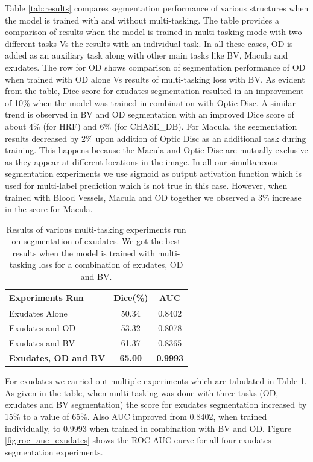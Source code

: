 \documentclass[utf8]{FrontiersinHarvard} %
\begin{document}
Table \ref{tab:results} compares segmentation performance of various structures when the model is trained with and without multi-tasking. The table provides a comparison of  results when  the model is trained in multi-tasking mode with two different tasks  Vs the results with an individual task. In all these cases, OD is added as an auxiliary task along with other main tasks like BV, Macula and exudates. The row for OD shows comparison of segmentation performance of OD when trained with OD alone Vs results of multi-tasking loss with BV.  As evident from the table, Dice score for exudates segmentation resulted in an improvement  of 10\% when the model was trained in combination with Optic Disc. A similar trend is observed in BV and OD segmentation with an improved Dice score of about 4\% (for HRF) and 6\% (for CHASE\_DB). For Macula, the segmentation results decreased by 2\% upon addition of Optic Disc as an additional task during training. This happens because the Macula and Optic Disc are mutually exclusive as they appear at different locations in the image. In all our simultaneous segmentation experiments we use sigmoid as output activation function which is used for multi-label prediction which is not true in this case. However, when trained with Blood Vessels, Macula and OD together we observed a 3\% increase in the score for Macula.

\begin{table}
\caption{Results of various multi-tasking experiments run on segmentation of exudates. We got the best results when the model is trained with multi-tasking loss for a combination of exudates, OD and BV.}
\begin{center}
\begin{tabular}{ |l|c|c|  }
\hline
\textbf{Experiments Run} & \textbf{Dice(\%)} & \textbf{AUC}\\
\hline
Exudates Alone & 50.34 & 0.8402 \\
\hline
Exudates and OD & 53.32 & 0.8078\\
\hline
Exudates and BV & 61.37 & 0.8365\\
\hline
\textbf{Exudates, OD and BV} & \textbf{65.00} & \textbf{0.9993} \\
\hline
\end{tabular}
\end{center}
\label{tab:exudates_improvement}
\end{table}

For exudates we carried out multiple experiments which are  tabulated in Table \ref{tab:exudates_improvement}. As given in the table, when multi-tasking was done with three tasks (OD, exudates and BV segmentation) the score for exudates segmentation  increased by 15\% to a value of 65\%. Also AUC improved from 0.8402, when trained individually, to 0.9993 when trained in combination with BV and OD. Figure \ref{fig:roc_auc_exudates} shows the ROC-AUC curve for all four exudates segmentation experiments.
\end{document}
